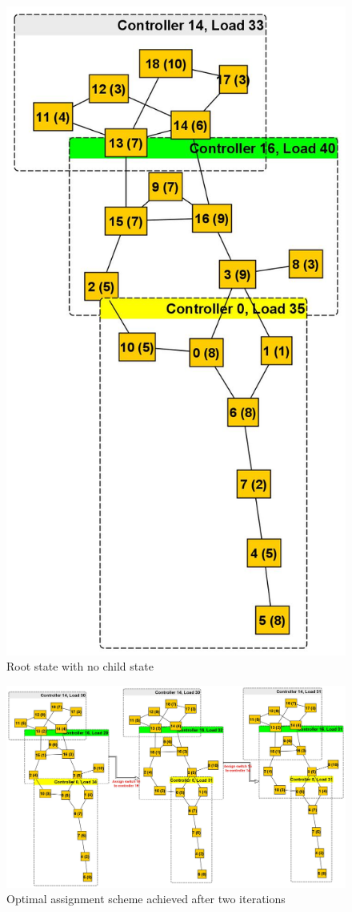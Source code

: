 \documentclass[a4paper,fleqn]{cas-dc}
\begin{document}
\begin{figure}
	\centering
	\includegraphics[width=0.65\linewidth]{Images/Aarnet_Load_1.jpg}
	\caption{Root state with no child state}
	\label{fig:aarnet2009l1}
\end{figure}

\begin{figure}
	\centering
	\includegraphics[width=\linewidth]{Images/Aarnet_Load_2.jpg}
	\caption{Optimal assignment scheme achieved after two iterations}
	\label{fig:aarnet2009l2}
\end{figure}
\end{document}
